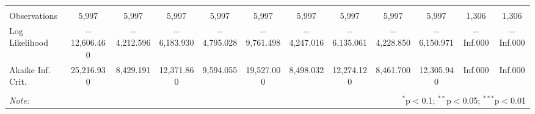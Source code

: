 \begin{tabular}{@{\extracolsep{5pt}}lccccccccccc}
  & & & & & & & & & & & \\ 
\hline \\[-1.8ex] 
Observations & 5,997 & 5,997 & 5,997 & 5,997 & 5,997 & 5,997 & 5,997 & 5,997 & 5,997 & 1,306 & 1,306 \\ 
Log Likelihood & $-$12,606.460 & $-$4,212.596 & $-$6,183.930 & $-$4,795.028 & $-$9,761.498 & $-$4,247.016 & $-$6,135.061 & $-$4,228.850 & $-$6,150.971 & $-$Inf.000 & $-$Inf.000 \\ 
Akaike Inf. Crit. & 25,216.930 & 8,429.191 & 12,371.860 & 9,594.055 & 19,527.000 & 8,498.032 & 12,274.120 & 8,461.700 & 12,305.940 & Inf.000 & Inf.000 \\ 
\hline 
\hline \\[-1.8ex] 
\textit{Note:}  & \multicolumn{11}{r}{$^{*}$p$<$0.1; $^{**}$p$<$0.05; $^{***}$p$<$0.01} \\ 
\end{tabular} 
